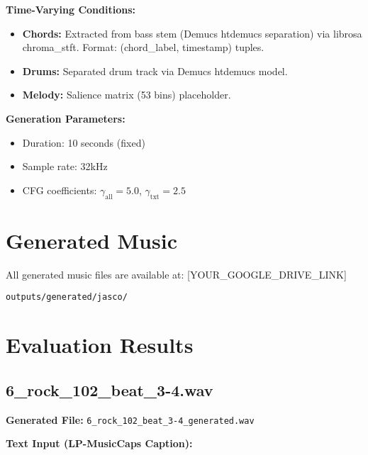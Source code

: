 \documentclass{article}
\begin{document}
\textbf{Time-Varying Conditions:}
\begin{itemize}
    \item \textbf{Chords:} Extracted from bass stem (Demucs htdemucs separation) via librosa chroma\_stft. Format: (chord\_label, timestamp) tuples.
    \item \textbf{Drums:} Separated drum track via Demucs htdemucs model.
    \item \textbf{Melody:} Salience matrix (53 bins) placeholder.
\end{itemize}

\textbf{Generation Parameters:}
\begin{itemize}
    \item Duration: 10 seconds (fixed)
    \item Sample rate: 32kHz
    \item CFG coefficients: $\gamma_{\text{all}}=5.0$, $\gamma_{\text{txt}}=2.5$
\end{itemize}

\section{Generated Music}

All generated music files are available at: [YOUR\_GOOGLE\_DRIVE\_LINK]

\texttt{outputs/generated/jasco/}

\section{Evaluation Results}

\subsection{6\_rock\_102\_beat\_3-4.wav}

\textbf{Generated File:} \texttt{6\_rock\_102\_beat\_3-4\_generated.wav}

\textbf{Text Input (LP-MusicCaps Caption):}
\end{document}

